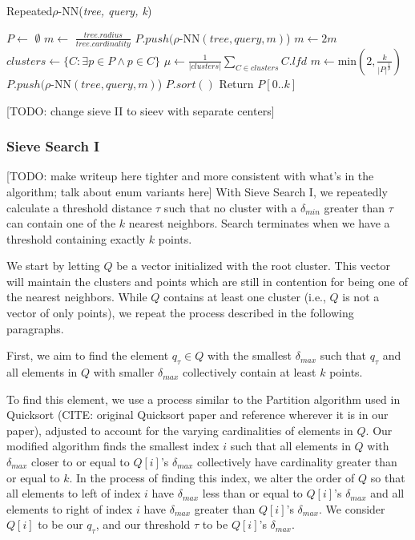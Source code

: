 \begin{algorithm} %
    \caption{Repeated$\rho$-NN(\emph{tree, query, k})} %
    \label{alg:knn-by-rnn} %
    \begin{algorithmic}[4] %
        \STATE $P \leftarrow$ $\emptyset$
        \STATE $m \leftarrow$ $\frac{tree.radius}{tree.cardinality}$
            \STATE $P.push(\rho$-NN$(tree, query, m)$)
            \STATE $m \leftarrow 2m$
        \ENDWHILE
            \STATE $clusters \leftarrow \{ C: \exists p \in P \land p \in C \}$
            \STATE $\mu \leftarrow \frac{1}{|clusters|} \sum_{C \in clusters} C.lfd$
            \STATE $m \leftarrow \text{min}\left(2, \frac{k}{|P|^{\frac{1}{\mu}}}\right)$
            \STATE $P.push(\rho$-NN$(tree, query, m)$)
        \ENDWHILE
        \STATE $P.sort()$
        \STATE Return $P[0..k]$
    \end{algorithmic}
    \end{algorithm}


[TODO: change sieve II to sieev with separate centers]
\subsubsection{Sieve Search I}
\label{subsubsec:methods:knn-search:sieve}
[TODO: make writeup here tighter and more consistent with what's in the algorithm; talk 
about enum variants here]
With Sieve Search I, we repeatedly calculate a threshold distance $\tau$ such that no cluster with a $\delta_{min}$ greater than $\tau$ 
can contain one of the $k$ nearest neighbors. Search terminates when we have a threshold containing exactly $k$ points.

We start by letting $Q$ be a vector initialized with the root cluster. This vector will maintain the 
clusters and points which are still in contention for being one of the nearest neighbors.
While $Q$ contains at least one cluster (i.e., $Q$ is not a vector of only points), we repeat the process described in 
the following paragraphs. 

First, 
we aim to find the element $q_{\tau} \in Q$ with the smallest $\delta_{max}$ such that 
$q_{\tau}$ and all elements in $Q$ with smaller $\delta_{max}$ collectively contain at least $k$ points. 

To find this element, 
we use a process similar to the Partition algorithm used in Quicksort (CITE: original Quicksort paper and reference wherever it is 
in our paper), adjusted to account for the varying cardinalities of elements in $Q$. Our modified algorithm finds the smallest index $i$ such 
that all elements in $Q$ with $\delta_{max}$ closer to or equal to $Q[i]$'s $\delta_{max}$ collectively have cardinality greater
than or equal to $k$. In the process of finding this index, we alter the order of $Q$ so that all elements to left
of index $i$ have $\delta_{max}$ less than or equal to $Q[i]$'s $\delta_{max}$ and all elements to right of index $i$
have $\delta_{max}$ greater than $Q[i]$'s $\delta_{max}$. We consider $Q[i]$ to be our $q_{\tau}$, and our threshold 
$\tau$ to be $Q[i]$'s $\delta_{max}$.

